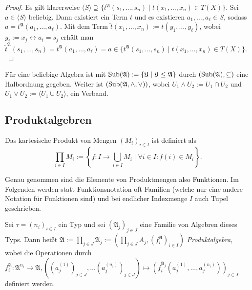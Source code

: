 \begin{proof}
    Es gilt klarerweise $\langle S\rangle\supseteq \{t^\mathfrak{A}(s_1,\ldots,s_n)\mid t(x_1,\ldots,x_n)\in T(X)\}$.
    Sei $a\in\langle S\rangle$ beliebig. Dann existiert ein Term $t$ und es existieren $a_1,\ldots,a_\ell\in S$,
    sodass $a=t^\mathfrak{A}(a_1,\ldots,a_\ell)$. Mit dem Term $\tilde{t}(x_1,\ldots,x_n):=t(y_1,\ldots,y_\ell)$, wobei $y_i:=x_j\leftrightarrow a_i=s_j$
    erhält man $\tilde{t}^\mathfrak{A}(s_1,\ldots,s_n)=t^\mathfrak{A}(a_1,\ldots,a_\ell)=a\in\{t^\mathfrak{A}(s_1,\ldots,s_n)\mid t(x_1,\ldots,x_n)\in T(X)\}.$
\end{proof}

\begin{remark}
    Für eine beliebige Algebra ist mit $\operatorname{Sub}(\mathfrak{A}):=\{\mathfrak{U}\mid \mathfrak{U}\le \mathfrak{A}\}$ durch
    $(\operatorname{Sub}(\mathfrak{A}),\subseteq)$ eine Halbordnung gegeben. Weiter ist $(\operatorname{Sub}(\mathfrak{A},\land,\lor))$,
    wobei $U_1\land U_2:=U_1\cap U_2$ und $U_1\lor U_2:=\langle U_1\cup U_2\rangle$, ein Verband.
\end{remark}

\subsection{Produktalgebren}

\begin{remark}
    Das kartesische Produkt von Mengen $(M_i)_{i \in I}$ ist definiert als 
    $$ \prod_{i \in I} M_i := \left\{f: I \to \bigcup_{i \in I} M_i \mid \forall i \in I: f(i) \in M_i \right\}. $$

    Genau genommen sind die Elemente von Produktmengen also Funktionen. Im Folgenden werden statt Funktionsnotation oft Familien (welche nur eine andere Notation für Funktionen sind) und bei endlicher Indexmenge $I$ auch Tupel geschrieben.
    
\end{remark}

\begin{definition}
    Sei $\tau = (n_i)_{i\in I}$ ein Typ und sei $(\mathfrak{A}_j)_{j\in J}$ eine Familie von Algebren dieses Typs.
    Dann heißt $\mathfrak{A}:=\prod_{j\in J}\mathfrak{A}_j:=(\prod_{j\in J}A_j,(f^\mathfrak{A}_i)_{i\in I})$ \emph{Produktalgebra},
    wobei die Operationen durch $f^\mathfrak{A}_i: \mathfrak{A}^{n_i} \to \mathfrak{A}, ((a_j^{(1)})_{j \in J}, \ldots (a_j^{(n_i)})_{j \in J}) \mapsto (f^{\mathfrak{A}_j}_i(a_j^{(1)}, \ldots, a_j^{(n_i)}))_{j \in J}$
    definiert werden.
\end{definition}

